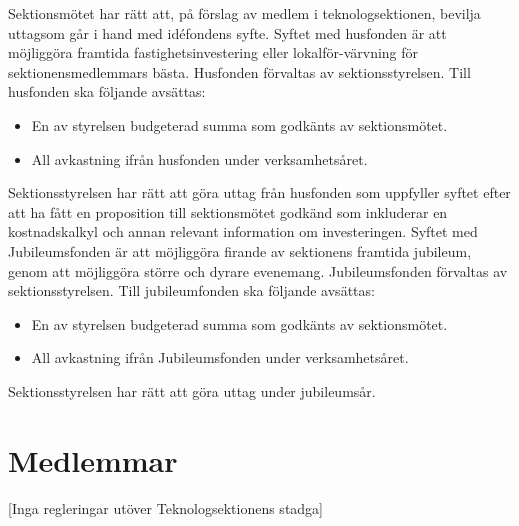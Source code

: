 \documentclass[a4paper]{dtek}
\begin{document}
\para Sektionsmötet har rätt att, på förslag av medlem i teknologsektionen, bevilja uttagsom går i hand med idéfondens syfte.
\para[Husfonden] Syftet med husfonden är att möjliggöra framtida fastighetsinvestering eller lokalför-värvning för sektionensmedlemmars bästa.
\para Husfonden förvaltas av sektionsstyrelsen.
\para Till husfonden ska följande avsättas:
\begin{itemize}
  \item En av styrelsen budgeterad summa som godkänts av sektionsmötet.
  \item All avkastning ifrån husfonden under verksamhetsåret.
\end{itemize}
\para Sektionsstyrelsen har rätt att göra uttag från husfonden som uppfyller syftet efter att ha fått en proposition till sektionsmötet godkänd som inkluderar en kostnadskalkyl och annan relevant information om investeringen.
\para[Jubileumsfonden] Syftet med Jubileumsfonden är att möjliggöra firande av sektionens framtida jubileum, genom att möjliggöra större och dyrare evenemang.
\para Jubileumsfonden förvaltas av sektionsstyrelsen.
\para Till jubileumfonden ska följande avsättas:
\begin{itemize}
  \item En av styrelsen budgeterad summa som godkänts av sektionsmötet.
  \item All avkastning ifrån Jubileumsfonden under verksamhetsåret.
\end{itemize}
\para Sektionsstyrelsen har rätt att göra uttag under jubileumsår.
\section{Medlemmar}
\begin{center}
  [Inga regleringar utöver Teknologsektionens stadga]
\end{center}
\end{document}
